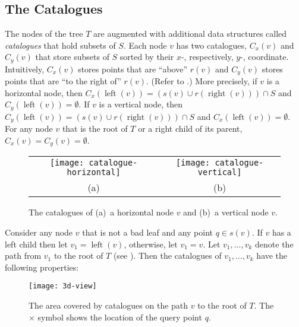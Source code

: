 \documentclass[charterfonts]{patmorin}
\DeclareMathOperator{\lft}{left}
\DeclareMathOperator{\rght}{right}
\begin{document}
\subsection{The Catalogues}

The nodes of the tree $T$ are augmented with additional data
structures called \emph{catalogues} that hold subsets of $S$.  Each
node $v$ has two catalogues, $C_x(v)$ and $C_y(v)$ that store subsets
of $S$ sorted by their $x$-, respectively, $y$-, coordinate.
Intuitively, $C_x(v)$ stores points that are ``above'' $r(v)$ and
$C_y(v)$ stores points that are ``to the right of'' $r(v)$.  (Refer to
.)  More precisely, if $v$ is a horizontal node,
then $C_x(\lft(v))= (s(v)\cup r(\rght(v)))\cap S$ and
$C_y(\lft(v))=\emptyset$.  If $v$ is a vertical node, then
$C_y(\lft(v)) = (s(v)\cup r(\rght(v)))\cap S$ and
$C_x(\lft(v))=\emptyset$.  For any node $v$ that is the root of $T$ or
a right child of its parent, $C_x(v)=C_y(v)=\emptyset$.  

\begin{figure}
  \begin{center}
    \begin{tabular}{c|c}
      \texttt{[image: catalogue-horizontal]} &
        \texttt{[image: catalogue-vertical]} \\
       (a) & (b) 
    \end{tabular}
  \end{center}
  \caption{The catalogues of (a)~a horizontal node $v$ and (b)~a
  vertical node $v$.}
\end{figure}


Consider any node $v$ that is not a bad leaf and any point $q\in s(v)$.
If $v$ has a left child then let $v_1=\lft(v)$, otherwise, let
$v_1=v$.
Let $v_1,\ldots,v_k$ denote the path from $v_1$ to the root of $T$
(see ).  Then the catalogues of $v_1,\ldots,v_k$ have
the following properties:
\begin{figure}
  \begin{center}
    \texttt{[image: 3d-view]}
  \end{center}
  \caption{The area covered by catalogues on the path $v$ to the root
of $T$. The $\times$ symbol shows the location of the query point $q$.}
\end{figure}
\end{document}
